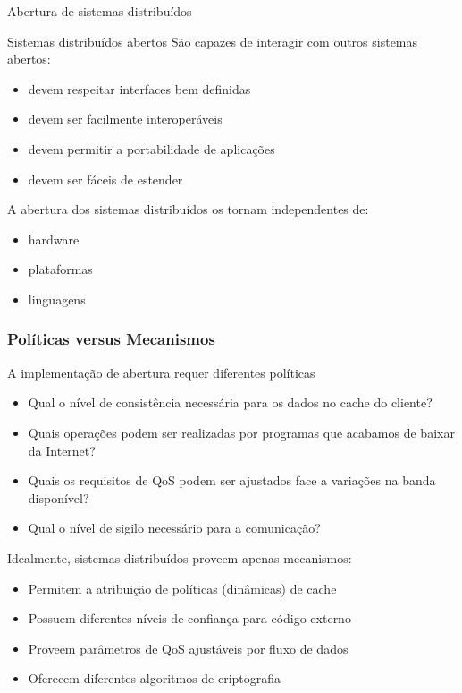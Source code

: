 \documentclass[Ligatures=TeX,table,brazil,svgnames,usetotalslideindicator,compress,10pt]{beamer}
\begin{document}
\begin{frame}{Abertura de sistemas distribuídos}

  \begin{block}{Sistemas distribuídos abertos}
    São capazes de interagir com outros sistemas abertos:

    \begin{itemize}
    \item devem respeitar \alert{interfaces} bem definidas
    \item devem ser facilmente \alert{interoperáveis}
    \item devem permitir a \alert{portabilidade} de aplicações
    \item devem ser fáceis de \alert{estender}
    \end{itemize}
  \end{block}

  \begin{block}{A abertura dos sistemas distribuídos os tornam independentes de:}
    \begin{itemize}
    \item hardware
    \item plataformas
    \item linguagens
    \end{itemize}
  \end{block}

\end{frame}

\begin{frame}
  \frametitle{Políticas versus Mecanismos}

  \begin{block}{A implementação de abertura requer diferentes \alert{políticas}}
    \begin{itemize}
    \item Qual o nível de consistência necessária para os dados no cache do cliente?
    \item Quais operações podem ser realizadas por programas que acabamos de baixar da Internet?
    \item Quais os requisitos de QoS podem ser ajustados face a variações na banda disponível?
    \item Qual o nível de sigilo necessário para a comunicação?
    \end{itemize}
  \end{block}

  \begin{block}{Idealmente, sistemas distribuídos proveem apenas \alert{mecanismos}:}
    \begin{itemize}
    \item Permitem a atribuição de políticas (dinâmicas) de cache
    \item Possuem diferentes níveis de confiança para código externo
    \item Proveem parâmetros de QoS ajustáveis por fluxo de dados
    \item Oferecem diferentes algoritmos de criptografia
    \end{itemize}
  \end{block}

\end{frame}
\end{document}
